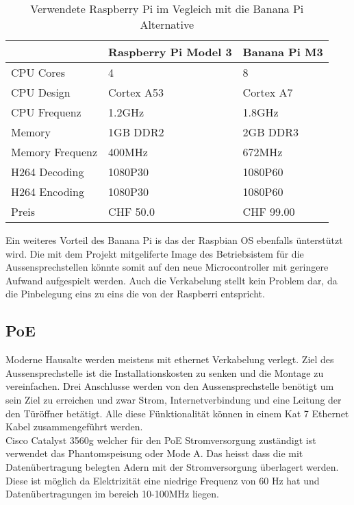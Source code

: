 \begin{table}[]
	\centering
	\label{my-label}
	\begin{tabular}{l|ll}
		\multicolumn{1}{r|}{} & Raspberry Pi Model 3 & Banana Pi M3 \\ \hline
		CPU Cores             & 4                    & 8            \\ \hline
		CPU Design            & Cortex A53           & Cortex A7    \\ \hline
		CPU Frequenz          & 1.2GHz               & 1.8GHz       \\ \hline
		Memory                & 1GB DDR2             & 2GB DDR3     \\ \hline
		Memory Frequenz       & 400MHz               & 672MHz       \\ \hline
		H264 Decoding         & 1080P30              & 1080P60      \\ \hline
		H264 Encoding         & 1080P30              & 1080P60      \\ \hline
		Preis				  & CHF 50.0             & CHF 99.00    \\ \hline
	\end{tabular}
\caption{Verwendete Raspberry Pi im Vegleich mit die Banana Pi Alternative}
\label{tbl:microcontrollerComparison}
\end{table}

Ein weiteres Vorteil des Banana Pi is das der Raspbian OS ebenfalls ünterstützt wird. Die mit dem Projekt mitgeliferte Image des Betriebsistem für die Aussensprechstellen könnte somit auf den neue Microcontroller mit geringere Aufwand aufgespielt werden. Auch die Verkabelung stellt kein Problem dar, da die Pinbelegung eins zu eins die von der Raspberri entspricht.

\subsection{PoE}
\label{sec:poe}
Moderne Hausalte werden meistens mit ethernet Verkabelung verlegt. Ziel des Aussensprechstelle ist die Installationskosten zu senken und die Montage zu vereinfachen. Drei Anschlusse werden von den Aussensprechstelle benötigt um sein Ziel zu erreichen und zwar Strom, Internetverbindung und eine Leitung der den Türöffner betätigt. Alle diese Fünktionalität können in einem Kat 7 Ethernet Kabel zusammengeführt werden. 
\\
Cisco Catalyst 3560g welcher für den PoE Stromversorgung zuständigt ist verwendet das Phantomspeisung oder Mode A. Das heisst dass die mit Datenübertragung belegten Adern mit der Stromversorgung überlagert werden. Diese ist möglich da Elektrizität eine niedrige Frequenz von 60 Hz hat und Datenübertragungen im bereich 10-100MHz liegen.

